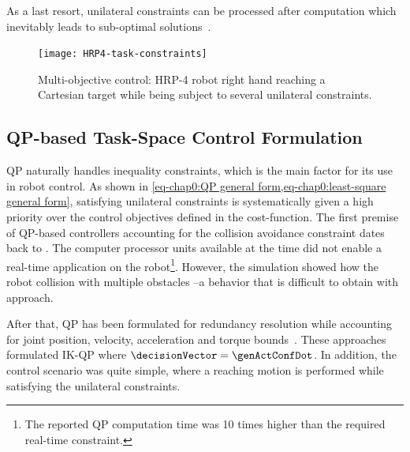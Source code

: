  As a last resort, unilateral constraints can be processed after computation which inevitably leads to sub-optimal solutions~\cite{baerlocher2004visualComputer,kim2016humanoids,feng2013humanoids}.
\begin{figure}
	\centering
	\texttt{[image: HRP4-task-constraints]}
	\caption{Multi-objective control: HRP-4 robot right hand reaching a Cartesian target while being subject to several unilateral constraints.}
	\label{fig:HRP4-task-constraints}
\end{figure}
\subsection{QP-based Task-Space Control Formulation}\label{subsec-chap0:task-space QP}
QP naturally handles inequality constraints, which is the main factor for its use in robot control. As shown in \cref{eq-chap0:QP general form,eq-chap0:least-square general form}, satisfying unilateral constraints is systematically given a high priority over the control objectives defined in the cost-function. %
The first premise of QP-based controllers accounting for the collision avoidance constraint dates back to \cite{faverjon1987icra}. The computer processor units available at the time did not enable a real-time application on the robot\footnote{The reported QP computation time was 10 times higher than the required real-time constraint.}. However, the simulation showed how the robot collision with multiple obstacles --a behavior that is difficult to obtain with \cite{khatib1985icra} approach. 

After that, QP has been formulated for redundancy resolution while accounting for joint position, velocity, acceleration and torque bounds~\cite{cheng1994tra,park1998icra,zhang2004transactionsonSysManCyb1,zhang2004transactionsonSysManCyb2,zhang2006icrb}. These approaches formulated IK-QP  where $\decisionVector=\genActConfDot$. In addition, the control scenario was quite simple, where a reaching motion is performed while satisfying the unilateral constraints. 


